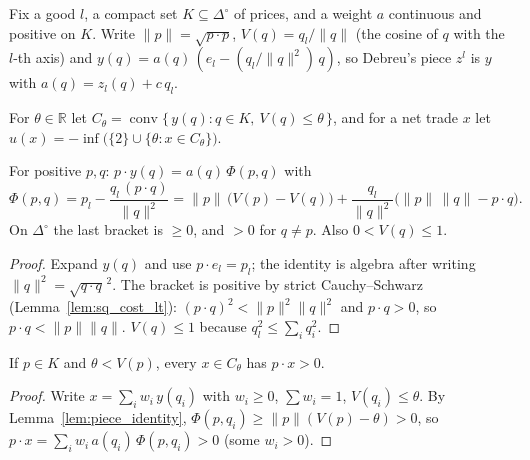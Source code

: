 Fix a good $l$, a compact set $K \subseteq \Delta^\circ$ of prices, and a weight $a$ continuous and positive on $K$. Write
$\|p\| = \sqrt{p\cdot p}$, $V(q) = q_l / \|q\|$ (the cosine of $q$ with the $l$-th axis) and
$y(q) = a(q)\,(e_l - (q_l/\|q\|^2)\,q)$, so Debreu's piece $z^l$ is $y$ with $a(q) = z_l(q) + c\,q_l$.

\begin{definition}
\label{def:piece_utility}
\leanok
{}
For $\theta \in \mathbb{R}$ let $C_\theta = \operatorname{conv}\{\,y(q) : q \in K,\ V(q) \le \theta\,\}$, and for a net trade
$x$ let $u(x) = -\inf\bigl(\{2\} \cup \{\theta : x \in C_\theta\}\bigr)$.
\end{definition}

\begin{lemma}
\label{lem:piece_identity}
\leanok
{}
For positive $p, q$: $p \cdot y(q) = a(q)\,\Phi(p,q)$ with
\[
  \Phi(p,q) = p_l - \frac{q_l\,(p\cdot q)}{\|q\|^2}
  = \|p\|\,\bigl(V(p) - V(q)\bigr) + \frac{q_l}{\|q\|^2}\bigl(\|p\|\,\|q\| - p\cdot q\bigr).
\]
On $\Delta^\circ$ the last bracket is $\ge 0$, and $> 0$ for $q \ne p$. Also $0 < V(q) \le 1$.
\end{lemma}
\begin{proof}
\leanok
Expand $y(q)$ and use $p \cdot e_l = p_l$; the identity is algebra after writing $\|q\|^2 = \sqrt{q\cdot q}^{\,2}$. The bracket is
positive by strict Cauchy--Schwarz (Lemma~\ref{lem:sq_cost_lt}): $(p\cdot q)^2 < \|p\|^2\|q\|^2$ and $p \cdot q > 0$, so
$p\cdot q < \|p\|\|q\|$. $V(q) \le 1$ because $q_l^2 \le \sum_i q_i^2$.
\end{proof}

\begin{lemma}
\label{lem:piece_sep}
\leanok
{}
If $p \in K$ and $\theta < V(p)$, every $x \in C_\theta$ has $p \cdot x > 0$.
\end{lemma}
\begin{proof}
\leanok
Write $x = \sum_i w_i\, y(q_i)$ with $w_i \ge 0$, $\sum w_i = 1$, $V(q_i) \le \theta$. By Lemma~\ref{lem:piece_identity},
$\Phi(p, q_i) \ge \|p\|(V(p) - \theta) > 0$, so $p \cdot x = \sum_i w_i\, a(q_i)\,\Phi(p,q_i) > 0$ (some $w_i > 0$).
\end{proof}

